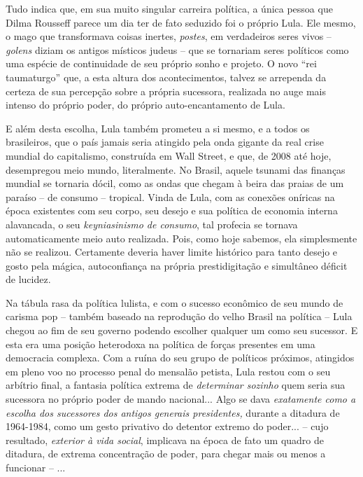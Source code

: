 Tudo indica que, em sua muito singular carreira política, a única pessoa
que Dilma Rousseff parece um dia ter de fato seduzido foi o próprio
Lula. Ele mesmo, o mago que transformava coisas inertes, \emph{postes},
em verdadeiros seres vivos -- \emph{golens} diziam os antigos místicos
judeus -- que se tornariam seres políticos como uma espécie de
continuidade de seu próprio sonho e projeto. O novo ``rei taumaturgo''
que, a esta altura dos acontecimentos, talvez se arrependa da certeza de
sua percepção sobre a própria sucessora, realizada no auge mais intenso
do próprio poder, do próprio auto-encantamento de Lula.

E além desta escolha, Lula também prometeu a si mesmo, e a todos os
brasileiros, que o país jamais seria atingido pela onda gigante da real
crise mundial do capitalismo, construída em Wall Street, e que, de 2008
até hoje, desempregou meio mundo, literalmente. No Brasil, aquele
tsunami das finanças mundial se tornaria dócil, como as ondas que chegam
à beira das praias de um paraíso -- de consumo -- tropical. Vinda de
Lula, com as conexões oníricas na época existentes com seu corpo, seu
desejo e sua política de economia interna alavancada, o seu
\emph{keyniasinismo de consumo}, tal profecia se tornava automaticamente
meio auto realizada. Pois, como hoje sabemos, ela simplesmente não se
realizou. Certamente deveria haver limite histórico para tanto desejo e
gosto pela mágica, autoconfiança na própria prestidigitação e simultâneo
déficit de lucidez.

Na tábula rasa da política lulista, e com o sucesso econômico de seu
mundo de carisma pop -- também baseado na reprodução do velho Brasil na
política -- Lula chegou ao fim de seu governo podendo escolher qualquer
um como seu sucessor. E esta era uma posição heterodoxa na política de
forças presentes em uma democracia complexa. Com a ruína do seu grupo de
políticos próximos, atingidos em pleno voo no processo penal do mensalão
petista, Lula restou com o seu arbítrio final, a fantasia política
extrema de \emph{determinar sozinho} quem seria sua sucessora no próprio
poder de mando nacional... Algo se dava \emph{exatamente como a escolha
dos sucessores dos antigos generais presidentes,} durante a ditadura de
1964-1984, como um gesto privativo do detentor extremo do poder... --
cujo resultado, \emph{exterior à vida social}, implicava na época de
fato um quadro de ditadura, de extrema concentração de poder, para
chegar mais ou menos a funcionar -- ...

